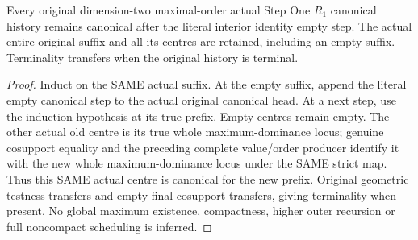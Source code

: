 \begin{theorem}
\label{hir:original-step-one-curve-interior-canonical-history}
\leanok
Every original dimension-two maximal-order actual Step One $R_1$ canonical
history remains canonical after the literal interior identity empty step.
The actual entire original suffix and all its centres are retained, including
an empty suffix. Terminality transfers when the original history is terminal.
\end{theorem}
\begin{proof}
Induct on the SAME actual suffix. At the empty suffix, append the literal
empty canonical step to the actual original canonical head. At a next step,
use the induction hypothesis at its true prefix. Empty centres remain empty.
The other actual old centre is its true whole maximum-dominance locus; genuine
cosupport equality and the preceding complete value/order producer identify
it with the new whole maximum-dominance locus under the SAME strict map.
Thus this SAME actual centre is canonical for the new prefix. Original
geometric testness transfers and empty final cosupport transfers, giving
terminality when present. No global maximum existence, compactness, higher
outer recursion or full noncompact scheduling is inferred.
\end{proof}
